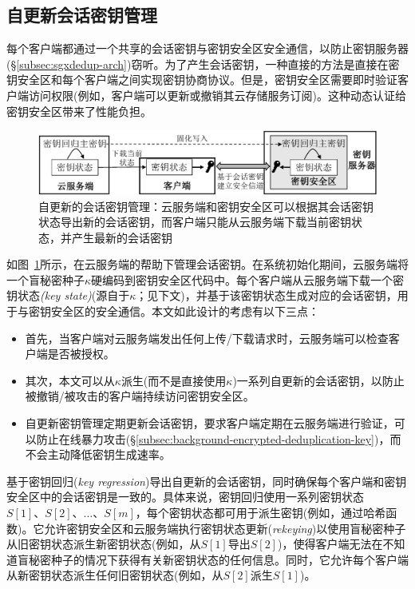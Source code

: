 \subsection{自更新会话密钥管理}
\label{subsec:sgxdedup-key-management}

每个客户端都通过一个共享的会话密钥与密钥安全区安全通信，以防止密钥服务器 (\S\ref{subsec:sgxdedup-arch})窃听。为了产生会话密钥，一种直接的方法是直接在密钥安全区和每个客户端之间实现密钥协商协议。但是，密钥安全区需要即时验证客户端访问权限(例如，客户端可以更新或撤销其云存储服务订阅)。这种动态认证给密钥安全区带来了性能负担。

\begin{figure}[!htb]
    \centering
    \includegraphics[width=\textwidth]{pic/sgxdedup/keyRegression.pdf}
    \caption{自更新的会话密钥管理：云服务端和密钥安全区可以根据其会话密钥状态导出新的会话密钥，而客户端只能从云服务端下载当前密钥状态，并产生最新的会话密钥}
    \label{fig:sgxdedup-keymanage}
\end{figure}

如图~\ref{fig:sgxdedup-keymanage}所示，\sysnameS 在云服务端的帮助下管理会话密钥。在系统初始化期间，云服务端将一个盲秘密种子$\kappa$硬编码到密钥安全区代码中。每个客户端从云服务端下载一个密钥状态\textit{(key state)}(源自于$\kappa$；见下文)，并基于该密钥状态生成对应的会话密钥，用于与密钥安全区的安全通信。本文如此设计的考虑有以下三点：
\begin{itemize}
    \item 首先，当客户端对云服务端发出任何上传/下载请求时，云服务端可以检查客户端是否被授权。
    \item 其次，本文可以从$\kappa$派生(而不是直接使用$\kappa$)一系列自更新的会话密钥，以防止被撤销/被攻击的客户端持续访问密钥安全区。
    \item 自更新密钥管理定期更新会话密钥，要求客户端定期在云服务端进行验证，可以防止在线暴力攻击(\S\ref{subsec:background-encrypted-deduplication-key})，而不会主动降低密钥生成速率\cite{bellare2013DupLESS}。
\end{itemize}

\sysnameS 基于密钥回归(\textit{key regression})\cite{fu06}导出自更新的会话密钥，同时确保每个客户端和密钥安全区中的会话密钥是一致的。具体来说，密钥回归使用一系列密钥状态$S[1]、S[2]、\ldots、S[m]$，每个密钥状态都可用于派生密钥(例如，通过哈希函数)。它允许密钥安全区和云服务端执行密钥状态更新(\textit{rekeying})以使用盲秘密种子从旧密钥状态派生新密钥状态(例如，从$S[1]$导出$S[2]$)，使得客户端无法在不知道盲秘密种子的情况下获得有关新密钥状态的任何信息。同时，它允许每个客户端从新密钥状态派生任何旧密钥状态(例如，从$S[2]$派生$S[1]$)。

